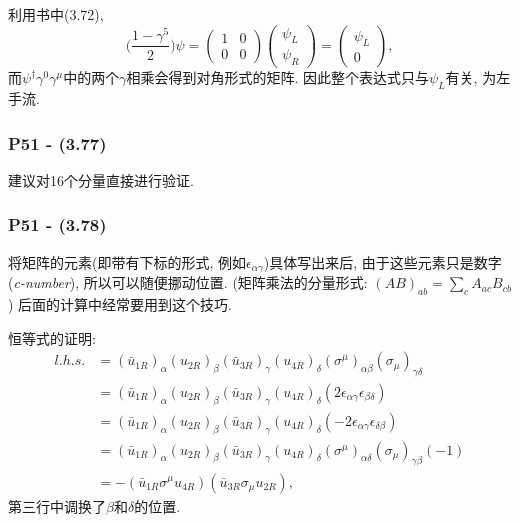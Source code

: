 \documentclass[cn,hazy,green,11pt,device=normal,chinesefont=founder]{elegantnote}
\begin{document}
利用书中(3.72), 
\begin{equation}
  \biggl( \frac{1 - \gamma^5}{2} \biggr) \psi = \left( \begin{array}{cc} 1 & 0 \\ 0 & 0 \end{array} \right) \left( \begin{array}{c} \psi_L \\ \psi_R \end{array} \right) = \left( \begin{array}{c} \psi_L \\ 0 \end{array} \right), 
\end{equation}
而$\psi^\dagger \gamma^0 \gamma^\mu$中的两个$\gamma$相乘会得到对角形式的矩阵. 因此整个表达式只与$\psi_L$有关, 为左手流. 

\subsubsection{P51 - (3.77)}

建议对16个分量直接进行验证. 

\subsubsection{P51 - (3.78)}

将矩阵的元素(即带有下标的形式, 例如$\epsilon_{\alpha \gamma}$)具体写出来后, 由于这些元素只是数字(\textit{c-number}), 所以可以随便挪动位置. (矩阵乘法的分量形式: $(AB)_{ab} = \sum_c A_{ac} B_{cb}$) 后面的计算中经常要用到这个技巧. 

恒等式的证明: 
\begin{equation}
  \begin{aligned}
    l.h.s. &= (\bar{u}_{1R})_\alpha (u_{2R})_\beta (\bar{u}_{3R})_\gamma (u_{4R})_\delta (\sigma^{\mu})_{\alpha\beta} (\sigma_{\mu})_{\gamma\delta} \\
    &= (\bar{u}_{1R})_\alpha (u_{2R})_\beta (\bar{u}_{3R})_\gamma (u_{4R})_\delta (2\epsilon_{\alpha\gamma} \epsilon_{\beta\delta}) \\
    &= (\bar{u}_{1R})_\alpha (u_{2R})_\beta (\bar{u}_{3R})_\gamma (u_{4R})_\delta (-2\epsilon_{\alpha\gamma} \epsilon_{\delta\beta}) \\
    &= (\bar{u}_{1R})_\alpha (u_{2R})_\beta (\bar{u}_{3R})_\gamma (u_{4R})_\delta (\sigma^{\mu})_{\alpha\delta} (\sigma_{\mu})_{\gamma\beta} (-1) \\
    &= -(\bar{u}_{1R} \sigma^{\mu} u_{4R})(\bar{u}_{3R} \sigma_{\mu} u_{2R}), 
  \end{aligned}
\end{equation}
第三行中调换了$\beta$和$\delta$的位置. 
\end{document}
